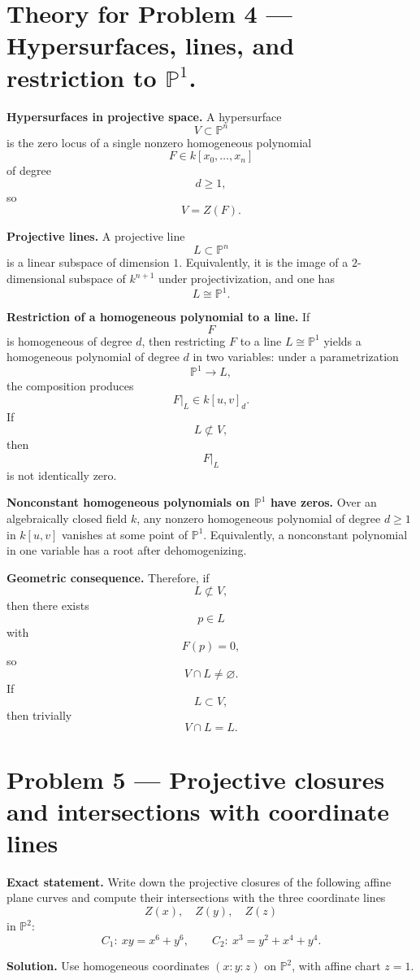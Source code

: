 \documentclass[12pt,a4paper]{article}
\theoremstyle{plain}
\theoremstyle{definition}      %
\begin{document}
\bigskip

\section*{Theory for Problem 4 — Hypersurfaces, lines, and restriction to $\mathbb{P}^1$.}

\textbf{Hypersurfaces in projective space.}
A hypersurface
\[
V\subset \mathbb{P}^n
\]
is the zero locus of a single nonzero homogeneous polynomial
\[
F\in k[x_0,\dots,x_n]
\]
of degree
\[
d\ge 1,
\]
so
\[
V=Z(F).
\]

\textbf{Projective lines.}
A projective line
\[
L\subset \mathbb{P}^n
\]
is a linear subspace of dimension $1$.
Equivalently, it is the image of a $2$-dimensional subspace of $k^{n+1}$ under projectivization, and one has
\[
L\cong \mathbb{P}^1.
\]

\textbf{Restriction of a homogeneous polynomial to a line.}
If
\[
F
\]
is homogeneous of degree $d$, then restricting $F$ to a line $L\cong \mathbb{P}^1$ yields a homogeneous polynomial of degree $d$ in two variables:
under a parametrization
\[
\mathbb{P}^1\to L,
\]
the composition produces
\[
F|_L \in k[u,v]_d.
\]
If
\[
L\not\subset V,
\]
then
\[
F|_L
\]
is not identically zero.

\textbf{Nonconstant homogeneous polynomials on $\mathbb{P}^1$ have zeros.}
Over an algebraically closed field $k$, any nonzero homogeneous polynomial of degree $d\ge 1$ in $k[u,v]$ vanishes at some point of $\mathbb{P}^1$.
Equivalently, a nonconstant polynomial in one variable has a root after dehomogenizing.

\textbf{Geometric consequence.}
Therefore, if
\[
L\not\subset V,
\]
then there exists
\[
p\in L
\]
with
\[
F(p)=0,
\]
so
\[
V\cap L\neq \varnothing.
\]
If
\[
L\subset V,
\]
then trivially
\[
V\cap L=L.
\]



\section*{Problem 5 — Projective closures and intersections with coordinate lines}

\textbf{Exact statement.}
Write down the projective closures of the following affine plane curves and compute their intersections with the three coordinate lines
\[
Z(x),\quad Z(y),\quad Z(z)
\]
in $\mathbb{P}^2$:
\[
C_1:\ xy=x^6+y^6,
\qquad
C_2:\ x^3=y^2+x^4+y^4.
\]

\textbf{Solution.}
Use homogeneous coordinates $(x:y:z)$ on $\mathbb{P}^2$, with affine chart $z=1$.
\end{document}
